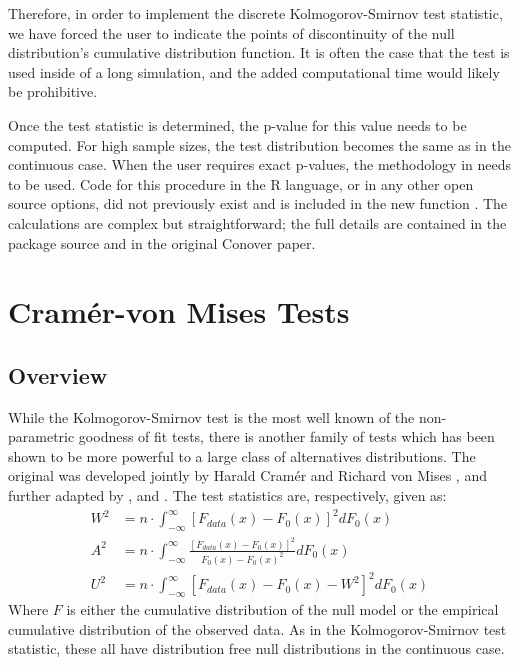 Therefore, in order to implement the discrete Kolmogorov-Smirnov test statistic, we have forced the user to indicate the points of discontinuity
of the null distribution's cumulative distribution function. It is often the case that the test is used inside of a long simulation, 
and the added computational time would likely be prohibitive. 

Once the test statistic is determined, the p-value for this value needs to be computed. For high sample sizes, the test distribution becomes the same as in the
continuous case. When the user requires exact p-values,
the methodology in \citet{Conover1972} needs to be used. Code for this procedure in the R language, or in any other open source options, did not previously
exist and is included in the new function . The calculations are complex but straightforward; 
the full details are contained in the package source and in the original Conover paper. 


\section{Cram\'{e}r-von Mises Tests}

\subsection{Overview}

While the Kolmogorov-Smirnov test is the most well known of the non-parametric goodness of fit tests, there is another family of 
tests which has been shown to be more powerful to a large class of alternatives distributions. The original was developed jointly by
Harald Cram\'{e}r and Richard von Mises \citep{cramer1928, vonmises1928}, and further adapted by \cite{anderson1952}, and 
\cite{Watson1961}. The test statistics are, respectively, given as:
\begin{align*}
W^2 &= n \cdot \int_{-\infty}^{\infty} \left[ F_{data}(x)- F_{0}(x) \right]^2 dF_0(x) \\
A^2 &= n \cdot \int_{-\infty}^{\infty} \frac{\left[F_{data}(x)- F_{0}(x) \right]^2}{F_0(x) -F_0(x)^2} dF_0(x) \\
U^2 &= n \cdot \int_{-\infty}^{\infty} \left[ F_{data}(x)- F_{0}(x) - W^2 \right]^2 dF_0(x)
\end{align*}
Where $F$ is either the cumulative distribution of the null model or the empirical cumulative distribution of the observed data.
As in the Kolmogorov-Smirnov test statistic, these all have distribution free null distributions in the continuous case. 

